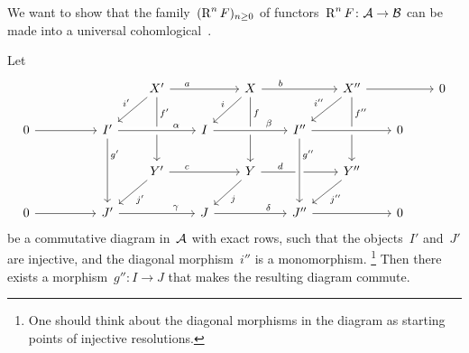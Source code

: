 \begin{goalnonum}
  We want to show that the family~$(\operatorname{R}^n F)_{n \geq 0}$ of functors~$\operatorname{R}^n F \colon \mathcal{A} \to \mathcal{B}$ can be made into a universal cohomlogical~{\deltafun}.
\end{goalnonum}


\begin{lemma}
  Let
  \[
    \begin{tikzcd}[column sep = 2em]
        {}
      & {}
      & {}
      & X'
        \arrow{rr}[above, near start]{a}
        \arrow{dl}[above left]{i'}
        \arrow{dd}[right, near start]{f'}
      & {}
      & X
        \arrow{rr}[above, near start]{b}
        \arrow{dl}[above left]{i}
        \arrow{dd}[right, near start]{f}
      & {}
      & X''
        \arrow{rr}
        \arrow{dl}[above left]{i''}
        \arrow{dd}[right, near start]{f''}
      & {}
      & 0
      \\
        0
        \arrow{rr}
      & {}
      & I'
        \arrow{dd}[right, near start]{g'}
      & {}
      & I
        \arrow[from=ll, crossing over, "\alpha", near end]
      & {}
      & I''
        \arrow[from=ll, crossing over, "\beta", near end]
      & {}
      & 0
        \arrow[from=ll, crossing over]
      & {}
      \\
        {}
      & {}
      & {}
      & Y'
        \arrow{rr}[above, near start]{c}
        \arrow{dl}[below right]{j'}
      & {}
      & Y
        \arrow{rr}[above, near start]{d}
        \arrow{dl}[below right]{j}
      & {}
      & Y''
        \arrow{dl}[below right]{j''}
      & {}
      & {}
      \\
        0
        \arrow{rr}
      & {}
      & J'
        \arrow{rr}[above, near end]{\gamma}
      & {}
      & J
        \arrow{rr}[above, near end]{\delta}
      & {}
      & J''
        \arrow[from=uu, crossing over, "g''", near start]
        \arrow{rr}
      & {}
      & 0
      & {}
    \end{tikzcd}
  \]
  be a commutative diagram in~$\mathcal{A}$ with exact rows, such that the objects~$I'$ and~$J'$ are injective, and the diagonal morphism~$i''$ is a monomorphism.%
  \footnote{One should think about the diagonal morphisms in the diagram as starting points of injective resolutions.}
  Then there exists a morphism~$g'' \colon I \to J$ that makes the resulting diagram commute.
\end{lemma}


